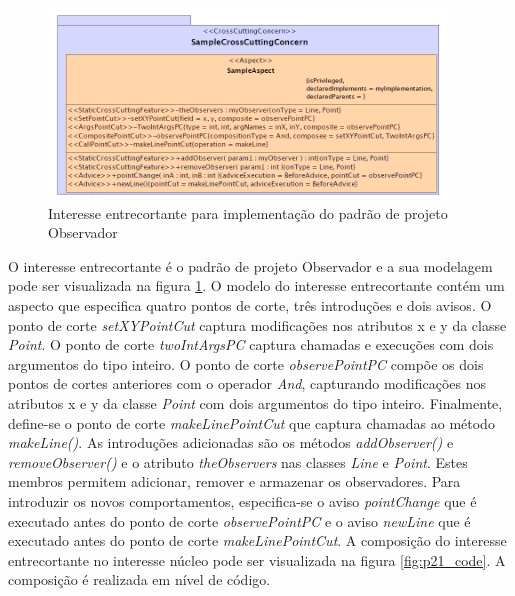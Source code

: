 \begin{figure}
	\centering
	\includegraphics[width=400px]{img/p21_extension_model.png}
	\caption{Interesse entrecortante para implementação do padrão de projeto Observador}\label{fig:p21_extension_model}
\end{figure}

O interesse entrecortante é o padrão de projeto Observador e a sua modelagem  pode ser visualizada na figura \ref{fig:p21_extension_model}. 
O modelo do interesse entrecortante contém um aspecto que especifica quatro pontos de corte, três introduções e dois avisos. O ponto de corte
\textit{setXYPointCut} captura modificações nos atributos x e y da classe \textit{Point}. O ponto de corte  \textit{twoIntArgsPC} captura chamadas e
execuções com dois argumentos do tipo inteiro. O ponto de corte \textit{observePointPC} compõe os dois pontos de cortes anteriores com o operador \textit{And},
capturando modificações nos atributos x e y da classe \textit{Point} com dois argumentos do tipo inteiro. Finalmente, define-se o ponto de corte 
\textit{makeLinePointCut} que captura chamadas ao método \textit{makeLine()}. As introduções adicionadas são os métodos \textit{addObserver()} e
\textit{removeObserver()} e o atributo \textit{theObservers} nas classes \textit{Line} e \textit{Point}. Estes membros permitem adicionar, remover e
armazenar os observadores. Para introduzir os novos comportamentos, especifica-se o aviso \textit{pointChange} que é executado antes do ponto de
corte \textit{observePointPC} e o aviso \textit{newLine} que é executado antes do ponto de corte \textit{makeLinePointCut}. A composição do interesse
entrecortante no interesse núcleo pode ser visualizada na figura \ref{fig:p21_code}. A composição é realizada em nível de código.

